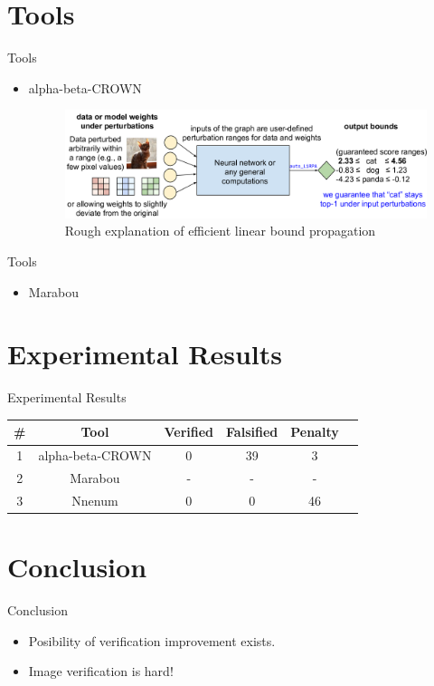 \documentclass[9pt]{beamer}
\begin{document}
\section{Tools}
\begin{frame}[plain,c]{Tools}
\begin{itemize}
    \item alpha-beta-CROWN
    \begin{figure}[h]
    \centering
    \includegraphics[scale=0.17]{figure4.png}
    \caption{Rough explanation of efficient linear bound propagation}
    \end{figure}
\end{itemize}
\end{frame}
\begin{frame}[plain,c]{Tools}
\begin{itemize}
    \item Marabou
\end{itemize}
\end{frame}

\section{Experimental Results}
\begin{frame}[plain,c]{Experimental Results}
\begin{center}
\begin{tabular}{ c c c c c c}
 \hline
 \textbf{\#} & \textbf{Tool} & \textbf{Verified} & \textbf{Falsified} & \textbf{Penalty}\\
 \hline
 1 & alpha-beta-CROWN & 0 & 39 & 3\\
 \hline
 2 & Marabou & - & - & -\\
 \hline
 3 & Nnenum & 0 & 0 & 46\\
 \hline
\end{tabular}
\end{center}
\end{frame}

\section{Conclusion}
\begin{frame}[plain,c]{Conclusion}
\begin{itemize}
    \item Posibility of verification improvement exists.
    \item Image verification is hard!
\end{itemize}
\end{frame}
\end{document}
